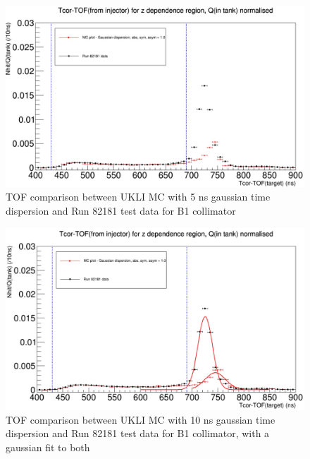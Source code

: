 \begin{figure}
    \centering
    \includegraphics[width=\textwidth]{Figures/Inked5ns_gaussian_dispersion_comparison.jpg}
    \caption{TOF comparison between UKLI MC with 5 ns gaussian time dispersion and Run 82181 test data for B1 collimator}
    \label{fig:5ns_time_dispersion}
\end{figure}

\begin{figure}
    \centering
    \includegraphics[width=\textwidth]{Figures/Inked10ns_gaussian_dispersion_with_fit.jpg}
    \caption{TOF comparison between UKLI MC with 10 ns gaussian time dispersion and Run 82181 test data for B1 collimator, with a gaussian fit to both}
    \label{fig:10ns_time_dispersion}
\end{figure}

